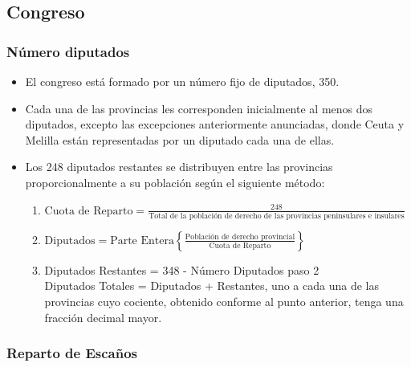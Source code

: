 \documentclass[12pt,a4paper,]{book}
\numberwithin{dummy}{section}
\theoremstyle{ocrenumbox}
\theoremstyle{blacknumex}
\theoremstyle{blacknumbox}
\theoremstyle{ocrenum}
\theoremstyle{ocrenum}
\begin{document}
\hypertarget{congreso}{%
\subsection{Congreso}\label{congreso}}

\hypertarget{nuxfamero-diputados}{%
\subsubsection{Número diputados}\label{nuxfamero-diputados}}

\begin{itemize}
\item
  El congreso está formado por un número fijo de diputados, 350.
\item
  Cada una de las provincias les corresponden inicialmente al menos dos
  diputados, excepto las excepciones anteriormente anunciadas, donde
  Ceuta y Melilla están representadas por un diputado cada una de ellas.
\item
  Los 248 diputados restantes se distribuyen entre las provincias
  proporcionalmente a su población según el siguiente método:

  \begin{enumerate}
  \def\labelenumi{\arabic{enumi}.}
  \item
    \(\textrm{Cuota de Reparto} = \frac{248}{\text{Total de la poblaci\'{o}n de derecho de las provincias peninsulares e insulares}}\)
  \item
    \(\textrm{Diputados} = \text{Parte Entera} \left\{\frac{\text{Población de derecho provincial}}{\text{Cuota de Reparto}}\right\}\)
  \item
    Diputados Restantes = 348 - Número Diputados paso 2\\
    Diputados Totales = Diputados + Restantes, uno a cada una de las
    provincias cuyo cociente, obtenido conforme al punto anterior, tenga
    una fracción decimal mayor.
  \end{enumerate}
\end{itemize}

\hypertarget{reparto-de-escauxf1os}{%
\subsubsection{Reparto de Escaños}\label{reparto-de-escauxf1os}}
\end{document}
